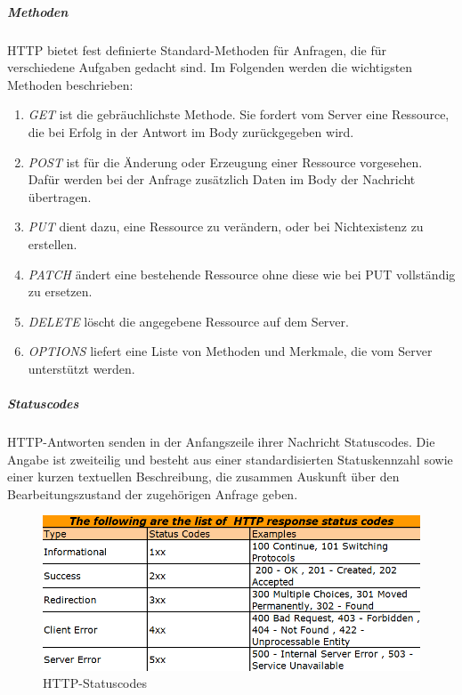 \subparagraph{Methoden}
HTTP bietet fest definierte Standard-Methoden für Anfragen, die für verschiedene Aufgaben gedacht sind. Im Folgenden werden die wichtigsten Methoden beschrieben:

\begin{enumerate}
		\item \textit{GET} ist die gebräuchlichste Methode. Sie fordert vom Server eine Ressource, die bei Erfolg in der Antwort im Body zurückgegeben wird. 
		
		\item \textit{POST} ist für die Änderung oder Erzeugung einer Ressource vorgesehen. Dafür werden bei der Anfrage zusätzlich Daten im Body der Nachricht übertragen.
		
		\item \textit{PUT} dient dazu, eine Ressource zu verändern, oder bei Nichtexistenz zu erstellen.
	
		\item \textit{PATCH} ändert eine bestehende Ressource ohne diese wie bei PUT vollständig zu ersetzen. 
		
		\item \textit{DELETE} löscht die angegebene Ressource auf dem Server.
		
		\item \textit{OPTIONS} liefert eine Liste von Methoden und Merkmale, die vom Server unterstützt werden.
		
\end{enumerate}

\subparagraph{Statuscodes}
HTTP-Antworten senden in der Anfangszeile ihrer Nachricht Statuscodes. Die Angabe ist zweiteilig und besteht aus einer standardisierten Statuskennzahl sowie einer kurzen textuellen Beschreibung, die zusammen Auskunft über den Bearbeitungszustand der zugehörigen Anfrage geben.\newline

\begin{figure}[h]
\centering
\includegraphics[width=\textwidth]{images/netzwerkprotokolle_Httpstatuscodes.png}
\caption{HTTP-Statuscodes}
\end{figure}

